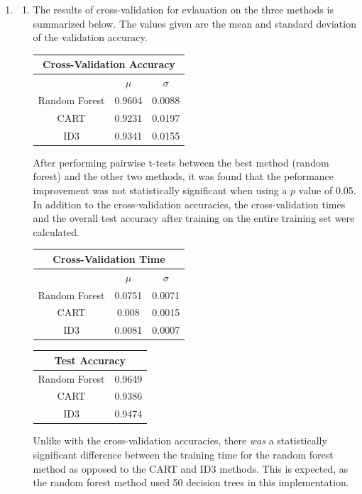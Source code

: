 \documentclass{article}
\begin{document}
\begin{enumerate}
\item 
\begin{enumerate}
	\item
		The results of cross-validation for evlauation on the three methods is summarized below. The values given are the mean and standard deviation of the validation accuracy.
		\begin{center}
			\begin{tabular}{ |c|c|c| }
				\hline
				\multicolumn{3}{|c|}{Cross-Validation Accuracy} \\
				\hline
				& $\mu$ & $\sigma$ \\
				\hline
				Random Forest & 0.9604 & 0.0088 \\
				CART & 0.9231 & 0.0197 \\
				ID3 & 0.9341 & 0.0155 \\
				\hline
			\end{tabular}
		\end{center}
		After performing pairwise t-tests between the best method (random forest) and the other two methods, it was found that the peformance improvement was not statistically significant when using a $p$ value of 0.05.
		In addition to the cross-validation accuracies, the cross-validation times and the overall test accuracy after training on the entire training set were calculated.
		\begin{center}
			\begin{tabular}{|c|c|c|}
				\hline
				\multicolumn{3}{|c|}{Cross-Validation Time} \\
				\hline
				& $\mu$ & $\sigma$ \\
				\hline
				Random Forest & 0.0751 & 0.0071 \\
				CART & 0.008 & 0.0015 \\
				ID3 & 0.0081 & 0.0007 \\
				\hline
			\end{tabular}
		\end{center}
		\begin{center}
                        \begin{tabular}{|c|c|}
                                \hline
                                \multicolumn{2}{|c|}{Test Accuracy} \\
                                \hline
                                Random Forest & 0.9649 \\
                                CART & 0.9386 \\
                                ID3 & 0.9474 \\
                                \hline
                        \end{tabular}
                \end{center}
		Unlike with the cross-validation accuracies, there \textit{was} a statistically significant difference between the training time for the random forest method as opposed to the CART and ID3 methods. This is expected, as the random forest method used 50 decision trees in this implementation.
		

\end{enumerate}
\end{enumerate}
\end{document}
